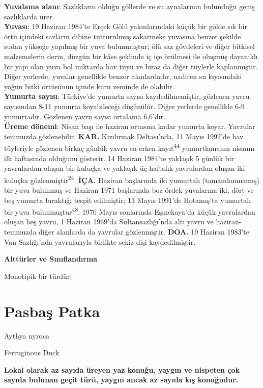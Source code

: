 \documentclass[
  letterpaper,
  DIV=11,
  numbers=noendperiod]{scrreprt}
\begin{document}
\textbf{Yuvalama alanı}: Sazlıkların olduğu göllerde ve su aynalarının
bulunduğu geniş sazlıklarda ürer.\\
\textbf{Yuvası}: 19 Haziran 1984'te Erçek Gölü yakınlarındaki küçük bir
gölde sık bir örtü içindeki sazların dibine tutturulmuş sakarmeke
yuvasına benzer şekilde sudan yükseğe yapılmış bir yuva bulunmuştur; ölü
saz gövdeleri ve diğer bitkisel malzemelerin derin, düzgün bir kâse
şeklinde iç içe örülmesi ile oluşmuş dayanıklı bir yapı olan yuva bol
miktarda hav tüyü ve biraz da diğer tüylerle kaplanmıştır. Diğer
yerlerde, yuvalar genellikle benzer alanlardadır, nadiren su kıyısındaki
yoğun bitki örtüsünün içinde kuru zeminde de olabilir.\\
\textbf{Yumurta sayısı}: Türkiye'de yumurta sayısı kaydedilmemiştir,
gözlenen yavru sayısından 8-11 yumurta koyabileceği düşünülür. Diğer
yerlerde genellikle 6-9 yumurtadır. Gözlenen yavru sayısı ortalama
6,6'dır.\\
\textbf{Üreme dönemi}: Nisan başı ile haziran ortasına kadar yumurta
koyar. Yavrular temmuzda gözlenebilir. \textbf{KAR.} Kızılırmak
Deltası'nda, 11 Mayıs 1992'de hav tüyleriyle gözlenen birkaç günlük
yavru en erken kayıt\textsuperscript{44} yumurtlamanın nisanın ilk
haftasında olduğunu gösterir. 14 Haziran 1984'te yaklaşık 5 günlük bir
yavrulardan oluşan bir kuluçka ve yaklaşık üç haftalık yavrulardan
oluşan iki kuluçka gözlenmiştir\textsuperscript{24}. \textbf{İÇA.}
Haziran başlarında iki yumurtalı (tamamlanmamış) bir yuva bulunmuş ve
Haziran 1971 başlarında boz ördek yuvalarına iki, dört ve beş yumurta
bıraktığı tespit edilmiştir; 13 Mayıs 1991'de Hotamış'ta yumurtalı bir
yuva bulunmuştur\textsuperscript{48}. 1970 Mayıs sonlarında Eşmekaya'da
küçük yavrulardan oluşan beş yavru, 1 Haziran 1969'da Sultansazlığı'nda
altı yavru ve haziran-temmuzda diğer alanlarda da yavrular gözlenmiştir.
\textbf{DOA.} 19 Haziran 1983'te Van Sazlığı'nda yavrularıyla birlikte
sekiz dişi kaydedilmiştir.

\textbf{Alttürler ve Sınıflandırma}

Monotipik bir türdür.

\section{Pasbaş Patka}\label{pasbaux15f-patka}

Aythya nyroca

Ferruginous Duck

\textbf{Lokal olarak az sayıda üreyen yaz konuğu, yaygın ve nispeten çok
sayıda bulunan geçit türü, yaygın ancak az sayıda kış konuğudur.}
\end{document}
